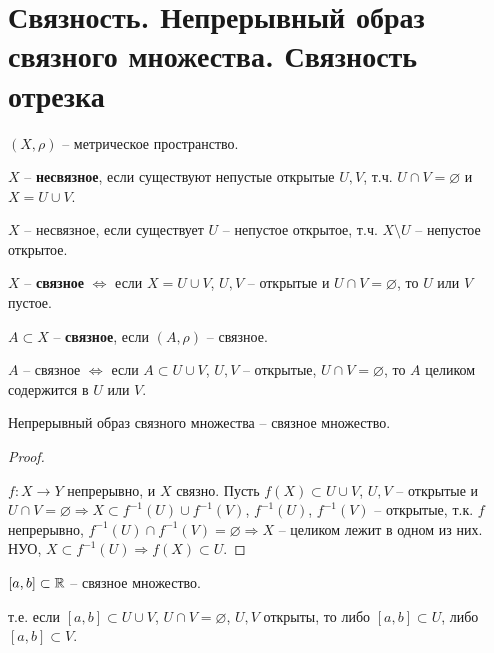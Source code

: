 
\section{Связность. Непрерывный образ связного множества. Связность отрезка \href{https://youtu.be/E7inz4tp-6k?t=6544}{\Walley}}


\begin{conj}
    $(X, \rho)$ -- метрическое пространство.
    
    $X$ -- \textbf{несвязное}, если существуют непустые открытые $U, V$, 
    т.ч. $U \cap V = \varnothing$ и $X = U \cup V$.
\end{conj}

\notice $X$ -- несвязное, если существует $U$ -- непустое
открытое, т.ч. $X \setminus U$ -- непустое открытое.

\begin{conj}
    $X$ -- \textbf{связное} $\Longleftrightarrow$ если $X = U \cup V$, 
    $U, V$ -- открытые и $U \cap V = \varnothing$, то $U$ или $V$ пустое.
\end{conj}

\begin{conj}
    $A \subset X$ -- \textbf{связное}, если $(A, \rho)$ -- связное.
\end{conj}

\notice $A$ -- связное $\Longleftrightarrow$ если $A \subset U \cup V$,
$U, V$ -- открытые, $U \cap V = \varnothing$, то $A$ целиком содержится
в $U$ или $V$.

\begin{theorem-non}
    Непрерывный образ связного множества -- связное множество.
\end{theorem-non}
\begin{proof} $ $

    $f: X \rightarrow Y$ непрерывно, и $X$ связно. Пусть $f(X) \subset
    U \cup V$, $U, V$ -- открытые и $U \cap V = \varnothing \Rightarrow
    X \subset f^{-1}(U) \cup f^{-1}(V)$, $f^{-1}(U)$, $f^{-1}(V)$ --
    открытые, т.к. $f$ непрерывно, $f^{-1}(U) \cap f^{-1}(V) =
    \varnothing \Rightarrow X$ -- целиком лежит в одном из них.
    НУО, $X \subset f^{-1}(U) \Rightarrow f(X) \subset U$.
\end{proof}

\begin{theorem-non}
$[a, b] \subset \mathbb{R}$ -- связное множество.
\end{theorem-non}
т.е. если $[a, b] \subset U \cup V$, $U \cap V = \varnothing$, $U, V$
открыты, то либо $[a, b] \subset U$, либо $[a, b] \subset V$.

